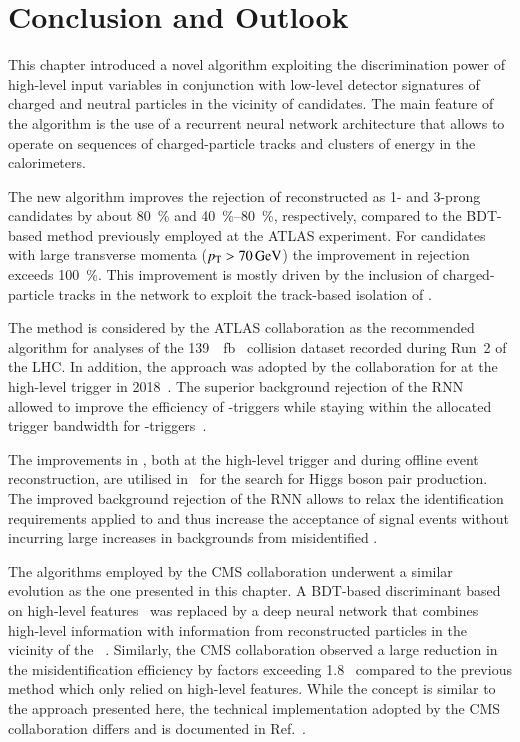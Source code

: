 \section{Conclusion and Outlook}%
\label{sec:tauid_conclusion}

This chapter introduced a novel \tauid algorithm exploiting the
discrimination power of high-level input variables in conjunction with
low-level detector signatures of charged and neutral particles in the
vicinity of \tauhadvis candidates. The main feature of the algorithm
is the use of a recurrent neural network architecture that allows to
operate on sequences of charged-particle tracks and clusters of energy
in the calorimeters.

The new algorithm improves the rejection of \faketauhadvis
reconstructed as 1- and 3-prong \tauhadvis candidates by about
\SI{80}{\percent} and \SIrange{40}{80}{\percent}, respectively,
compared to the BDT-based method previously employed at the ATLAS
experiment. For \tauhadvis candidates with large transverse momenta
($\pT > \SI{70}{\GeV}$) the improvement in \faketauhadvis rejection
exceeds \SI{100}{\percent}. This improvement is mostly driven by the
inclusion of charged-particle tracks in the network to exploit the
track-based isolation of \tauhadvis.

The method is considered by the ATLAS collaboration as the recommended \tauid
algorithm for analyses of the \SI{139}{\per\femto\barn} \pp~collision dataset
recorded during Run~2 of the LHC. In addition, the approach was adopted by the
collaboration for \tauid at the high-level trigger in
2018~\cite{ATL-DAQ-PUB-2019-001}. The superior background rejection of the RNN
\tauid allowed to improve the efficiency of \tauhadvis-triggers while staying
within the allocated trigger bandwidth for
\tauhadvis-triggers~\cite{ATL-DAQ-PUB-2019-001}.

The improvements in \tauid, both at the high-level trigger and during
offline event reconstruction, are utilised in~ for
the search for Higgs boson pair production. The improved background
rejection of the RNN allows to relax the identification requirements
applied to \tauhadvis and thus increase the acceptance of signal
events without incurring large increases in backgrounds from
misidentified \tauhadvis.

The \tauid algorithms employed by the CMS collaboration underwent a
similar evolution as the one presented in this chapter. A BDT-based
discriminant based on high-level features~\cite{CMS-TAU-16-003} was
replaced by a deep neural network that combines high-level information
with information from reconstructed particles in the vicinity of the
\tauhadvis~\cite{CMS-TAU-20-001}. Similarly, the CMS collaboration
observed a large reduction in the \faketauhadvis misidentification
efficiency by factors exceeding 1.8~\cite{CMS-TAU-20-001} compared to
the previous method which only relied on high-level features. While
the concept is similar to the approach presented here, the technical
implementation adopted by the CMS collaboration differs and is
documented in Ref.~\cite{CMS-TAU-20-001}.

